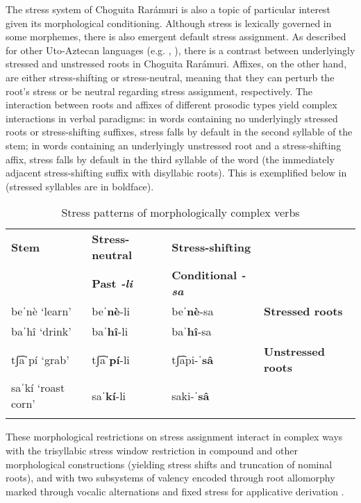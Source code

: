The stress system of Choguita Rarámuri is also a topic of particular interest given its morphological conditioning. Although stress is lexically governed in some morphemes, there is also emergent default stress assignment. As described for other {Uto-Aztecan} languages (e.g. , \citet{hill1968stress,alderete2001dominance}), there is a contrast between underlyingly stressed and unstressed roots in Choguita Rarámuri. Affixes, on the other hand, are either stress-shifting or stress-neutral, meaning that they can perturb the root’s stress or be neutral regarding stress assignment, respectively. The interaction between roots and affixes of different prosodic types yield complex interactions in verbal paradigms: in words containing no underlyingly stressed roots or stress-shifting suffixes, stress falls by default in the second syllable of the stem; in words containing an underlyingly unstressed root and a stress-shifting affix, stress falls by default in the third syllable of the word (the immediately adjacent stress-shifting suffix with disyllabic roots). This is exemplified below in  (stressed syllables are in boldface).

\begin{table}
\caption{Stress patterns of morphologically complex verbs}
\label{tab:stress}

\begin{tabularx}{\textwidth}{QQQl}
\lsptoprule
\textbf{Stem} & \textbf{Stress-neutral} & \textbf{Stress-shifting} & \\
 & \textbf{Past \textit{-li}} & \textbf{Conditional \textit{-sa}} & \\
 \midrule
beˈnè `learn’ & be\textbf{ˈnè}-li & be\textbf{ˈnè}-sa & \textbf{Stressed roots} \\
baˈhî `drink' & ba\textbf{ˈhî}-li & ba\textbf{ˈhî}-sa & \\
tʃ͡aˈpí `grab' & tʃ͡a\textbf{ˈpí}-li & tʃ͡api-\textbf{ˈsâ} & \textbf{Unstressed roots} \\
saˈkí `roast corn' & sa\textbf{ˈkí}-li & saki-\textbf{ˈsâ} & \\
\lspbottomrule
\end{tabularx}
\end{table}
\hspace{3cm}

These morphological restrictions on stress assignment interact in complex ways with the trisyllabic stress window restriction in compound and other morphological constructions (yielding stress shifts and truncation of nominal roots), and with two subsystems of valency encoded through root allomorphy marked through vocalic alternations and fixed stress for applicative derivation \citep{caballero2008choguita}.

